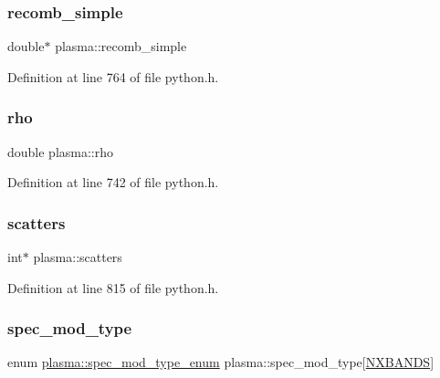 \subsubsection{\texorpdfstring{recomb\+\_\+simple}{recomb\_simple}}
{\footnotesize\ttfamily double$\ast$ plasma\+::recomb\+\_\+simple}



Definition at line 764 of file python.\+h.

\mbox{\label{structplasma_aeffd93110218aa8876f074488b026390}} 
\subsubsection{\texorpdfstring{rho}{rho}}
{\footnotesize\ttfamily double plasma\+::rho}



Definition at line 742 of file python.\+h.

\mbox{\label{structplasma_ada2361ccbc0c5103f58d097af8b5dfe7}} 
\subsubsection{\texorpdfstring{scatters}{scatters}}
{\footnotesize\ttfamily int$\ast$ plasma\+::scatters}



Definition at line 815 of file python.\+h.

\mbox{\label{structplasma_a110b6efdc5fa932c21dc021047b35eea}} 
\subsubsection{\texorpdfstring{spec\+\_\+mod\+\_\+type}{spec\_mod\_type}}
{\footnotesize\ttfamily enum \hyperlink{structplasma_a51fdb6f34dda1cdb03a9aebfee249706}{plasma\+::spec\+\_\+mod\+\_\+type\+\_\+enum}  plasma\+::spec\+\_\+mod\+\_\+type\mbox{[}\hyperlink{python_8h_ac640b7fc429348ef2f6781704d3c5163}{N\+X\+B\+A\+N\+DS}\mbox{]}}

\mbox{\label{structplasma_a9b217285a754e1533f95d92972b6afd6}} 
